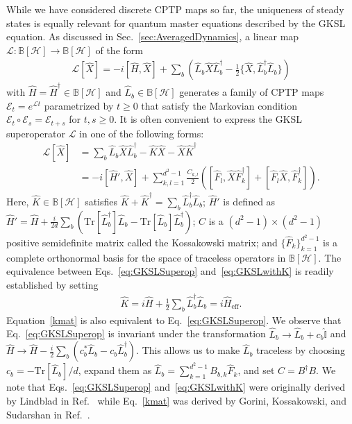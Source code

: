 \documentclass[preprint,pteplogo]{ptephy_v2}%
\numberwithin{equation}{section}
\theoremstyle{definition}
\newcommand{\mc}[1]{\mathcal{#1}}
\newcommand{\mr}[1]{\mathrm{#1}}
\newcommand{\mbb}[1]{\mathbb{#1}}
\newcommand{\Tr}{\mr{Tr}}
\begin{document}
While we have considered discrete CPTP maps so far, the uniqueness of steady states is equally relevant for quantum master equations described by the GKSL equation.
As discussed in Sec.~\ref{sec:AveragedDynamics}, a linear map $\mc{L}: \mbb{B}[\mc{H}] \to \mbb{B}[\mc{H}]$ of the form 
\begin{align} \label{eq:GKSLSuperop}
\mc{L}[\hat{X}] = -i[\hat{H}, \hat{X}] + \sum_b \left( \hat{L}_b \hat{X} \hat{L}_b^\dagger - \frac{1}{2} \{ \hat{X}, \hat{L}_b^\dagger \hat{L}_b \} \right)
\end{align}
with $\hat{H}=\hat{H}^\dagger \in \mbb{B}[\mc{H}]$ and $\hat{L}_b \in \mbb{B}[\mc{H}]$ generates a family of CPTP maps $\mc{E}_t = e^{\mc{L} t}$ parametrized by $t \geq 0$ that satisfy the Markovian condition $\mc{E}_t \circ \mc{E}_s = \mc{E}_{t+s}$ for $t,s \geq 0$.
It is often convenient to express the GKSL superoperator $\mc{L}$ in one of the following forms:
\begin{align}
\label{eq:GKSLwithK}
\mc{L}[\hat{X}] 
&= \sum_b \hat{L}_b \hat{X} \hat{L}_b^\dagger -\hat{K} \hat{X} -\hat{X} \hat{K}^\dagger \\
\label{kmat}
&= -i[\hat{H}', \hat{X}] + \sum_{k,l=1}^{d^2-1} \frac{C_{k,l}}{2} \left( [\hat{F}_l, \hat{X} \hat{F}_k^\dagger] + [\hat{F}_l \hat{X}, \hat{F}_k^\dagger] \right).
\end{align}
Here, $\hat{K} \in \mbb{B}[\mc{H}]$ satisfies $\hat{K} + \hat{K}^\dagger = \sum_b \hat{L}_b^\dagger \hat{L}_b$; $\hat{H}'$ is defined as $\hat{H}' = \hat{H} +\frac{i}{2d} \sum_b ( \Tr[\hat{L}_b^\dagger] \hat{L}_b -\Tr[\hat{L}_b] \hat{L}_b^\dagger)$; $C$ is a $(d^2-1) \times (d^2-1)$ positive semidefinite matrix called the Kossakowski matrix; and $\{ \hat{F}_k \}_{k=1}^{d^2-1}$ is a complete orthonormal basis for the space of traceless operators in $\mbb{B}[\mc{H}]$.
The equivalence between Eqs.~\eqref{eq:GKSLSuperop} and~\eqref{eq:GKSLwithK} is readily established by setting
\begin{align}
\hat{K} = i\hat{H} + \frac{1}{2} \sum_b \hat{L}_b^\dagger \hat{L}_b=i\hat{H}_\mr{eff}.
\end{align}
Equation~\eqref{kmat} is also equivalent to Eq.~\eqref{eq:GKSLSuperop}.
We observe that Eq.~\eqref{eq:GKSLSuperop} is invariant under the transformation $\hat{L}_b \to \hat{L}_b + c_b \hat{\mbb{I}}$ and $\hat{H} \to \hat{H} -\frac{i}{2} \sum_b (c_b^* \hat{L}_b -c_b \hat{L}_b^\dagger)$.
This allows us to make $\hat{L}_b$ traceless by choosing $c_b = -\Tr[\hat{L}_b]/d$, expand them as $\hat{L}_b = \sum_{k=1}^{d^2-1} B_{b,k} \hat{F}_k$, and set $C = B^\dagger B$.
We note that Eqs.~\eqref{eq:GKSLSuperop} and~\eqref{eq:GKSLwithK} were originally derived by Lindblad in Ref.~\cite{lindblad1976generators} while Eq.~\eqref{kmat} was derived by Gorini, Kossakowski, and Sudarshan in Ref.~\cite{gorini1976completely}.
\end{document}
